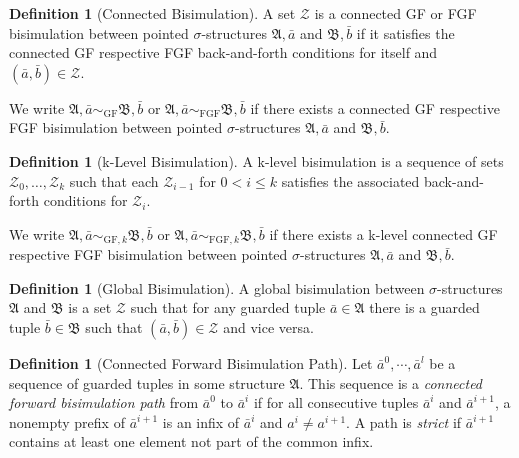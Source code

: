\documentclass[draft]{scrartcl}
\theoremstyle{definition}
\newtheorem{definition}[theorem]{Definition}
\begin{document}
\begin{definition}[Connected Bisimulation]
A set $\mathcal{Z}$ is a connected GF or FGF bisimulation between pointed $\sigma$-structures $\mathfrak{A}, \bar{a}$ and $\mathfrak{B}, \bar{b}$ if it satisfies the connected GF respective FGF back-and-forth conditions for itself and $(\bar{a}, \bar{b}) \in \mathcal{Z}$.
\end{definition}

We write $\mathfrak{A}, \bar{a} \sim_{\textrm{GF}} \mathfrak{B}, \bar{b}$ or $\mathfrak{A}, \bar{a} \sim_{\textrm{FGF}} \mathfrak{B}, \bar{b}$ if there exists a connected GF respective FGF bisimulation between pointed $\sigma$-structures $\mathfrak{A}, \bar{a}$ and $\mathfrak{B}, \bar{b}$.

\begin{definition}[k-Level Bisimulation]
A k-level bisimulation is a sequence of sets $\mathcal{Z}_0, \ldots, \mathcal{Z}_k$ such that each $\mathcal{Z}_{i - 1}$ for $0 < i \le k$ satisfies the associated back-and-forth conditions for $\mathcal{Z}_i$.
\end{definition}

We write $\mathfrak{A}, \bar{a} \sim_{\textrm{GF}, k} \mathfrak{B}, \bar{b}$ or $\mathfrak{A}, \bar{a} \sim_{\textrm{FGF}, k} \mathfrak{B}, \bar{b}$ if there exists a k-level connected GF respective FGF bisimulation between pointed $\sigma$-structures $\mathfrak{A}, \bar{a}$ and $\mathfrak{B}, \bar{b}$.

\begin{definition}[Global Bisimulation]
A global bisimulation between $\sigma$-structures $\mathfrak{A}$ and $\mathfrak{B}$ is a set $\mathcal{Z}$ such that for any guarded tuple $\bar{a} \in \mathfrak{A}$ there is a guarded tuple $\bar{b} \in \mathfrak{B}$ such that $(\bar{a}, \bar{b}) \in \mathcal{Z}$ and vice versa.
\end{definition}

\begin{definition}[Connected Forward Bisimulation Path]\label{def:bisim-path}
  Let $\bar{a}^{0}, \cdots, \bar{a}^{l}$ be a sequence of guarded tuples in some structure $\mathfrak{A}$.
  This sequence is a \emph{connected forward bisimulation path} from $\bar{a}^{0}$ to $\bar{a}^{i}$ if for all consecutive tuples $\bar{a}^{i}$ and $\bar{a}^{i+1}$,
  a nonempty prefix of $\bar{a}^{i+1}$ is an infix of $\bar{a}^{i}$ and $a^{i} \ne a^{i+1}$.
  A path is \emph{strict} if $\bar{a}^{i+1}$ contains at least one element not part of the common infix.
\end{definition}
\end{document}
